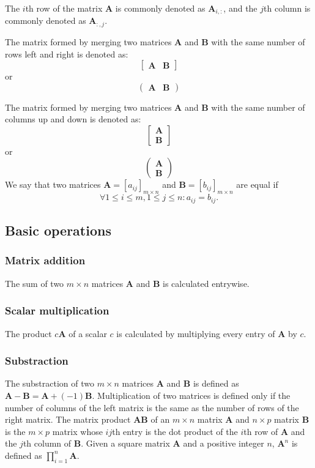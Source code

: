 \documentclass[a4paper,12pt]{report}
\begin{document}
The $i$th row of the matrix $\mathbf{A}$ is commonly denoted as $\mathbf{A}_{i,:}$, and the $j$th column is commonly denoted as $\mathbf{A}_{:,j}$.

The matrix formed by merging two matrices $\mathbf{A}$ and $\mathbf{B}$ with the same number of rows left and right is denoted as:
\[\begin{bmatrix}\mathbf{A} & \mathbf{B}\end{bmatrix}\]
or
\[\begin{pmatrix}\mathbf{A} & \mathbf{B}\end{pmatrix}\]

The matrix formed by merging two matrices $\mathbf{A}$ and $\mathbf{B}$ with the same number of columns up and down is denoted as:
\[\begin{bmatrix}\mathbf{A} \\ \mathbf{B}\end{bmatrix}\]
or
\[\begin{pmatrix}\mathbf{A} \\ \mathbf{B}\end{pmatrix}\]
We say that two matrices $\mathbf{A}=[a_{ij}]_{m\times n}$ and $\mathbf{B}=[b_{ij}]_{m\times n}$ are equal if 
\[\forall 1\leq i\leq m,1\leq j\leq n\colon a_{ij}=b_{ij}.\]
\subsection{Basic operations}
\subsubsection{Matrix addition}
The sum of two $m\times n$ matrices $\mathbf{A}$ and $\mathbf{B}$ is calculated entrywise.
\subsubsection{Scalar multiplication}
The product $c\mathbf{A}$ of a scalar $c$ is calculated by multiplying every entry of $\mathbf{A}$ by $c$.
\subsubsection{Substraction}
The substraction of two $m\times n$ matrices $\mathbf{A}$ and $\mathbf{B}$ is defined as $\mathbf{A}-\mathbf{B}=\mathbf{A}+(-1)\mathbf{B}$.
Multiplication of two matrices is defined only if the number of columns of the left matrix is the same as the number of rows of the right matrix. The matrix product $\mathbf{A}\mathbf{B}$ of an $m\times n$ matrix $\mathbf{A}$ and $n\times p$ matrix $\mathbf{B}$ is the $m\times p$ matrix whose $ij$th entry is the dot product of the $i$th row of $\mathbf{A}$ and the $j$th column of $\mathbf{B}$.
Given a square matrix $\mathbf{A}$ and a positive integer $n$, $\mathbf{A}^n$ is defined as $\prod_{i=1}^n\mathbf{A}$.
\end{document}
